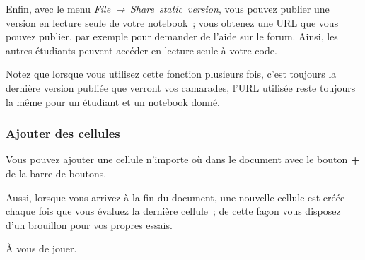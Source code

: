    Enfin, avec le menu \emph{File~→~Share~static~version}, vous pouvez
publier une version en lecture seule de votre notebook~; vous obtenez
une URL que vous pouvez publier, par exemple pour demander de l'aide sur
le forum. Ainsi, les autres étudiants peuvent accéder en lecture seule à
votre code.

    Notez que lorsque vous utilisez cette fonction plusieurs fois, c'est
toujours la dernière version publiée que verront vos camarades, l'URL
utilisée reste toujours la même pour un étudiant et un notebook donné.

    \hypertarget{ajouter-des-cellules}{%
\subsubsection{Ajouter des cellules}\label{ajouter-des-cellules}}

    Vous pouvez ajouter une cellule n'importe où dans le document avec le
bouton \textbf{+} de la barre de boutons.

Aussi, lorsque vous arrivez à la fin du document, une nouvelle cellule
est créée chaque fois que vous évaluez la dernière cellule~; de cette
façon vous disposez d'un brouillon pour vos propres essais.

À vous de jouer.


    
    
    
